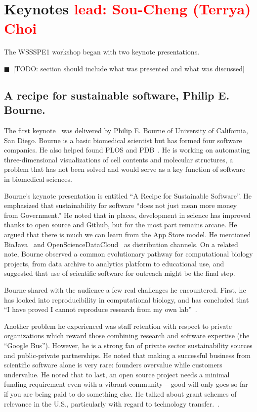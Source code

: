 \documentclass[11pt, oneside]{amsart}
\newcommand{\todo}[1]{{\color{blue}$\blacksquare$~\textsf{[TODO: #1]}}}
\newcommand{\note}[1]{ {\textcolor{red}    { #1 }}}
\begin{document}
\section{Keynotes\note{lead: Sou-Cheng (Terrya) Choi}} \label{sec:keynotes}

The WSSSPE1 workshop began with two keynote presentations.

\todo{section should include what was presented and what was discussed}

\subsection{A recipe for sustainable software, Philip E. Bourne.}

The first
keynote~\cite{WSSSPE1-keynote1}
was delivered by Philip E. Bourne of University of California, San Diego.  Bourne is a basic biomedical scientist but has formed four software
companies. He also helped found PLOS and
PDB~\cite{pdb-web}.  He is
working on automating three-dimensional visualizations of cell
contents and molecular structures, a problem that has not been solved
and would serve as a key function of software in biomedical sciences.

Bourne's keynote presentation is entitled ``A Recipe for Sustainable Software''.
He emphasized that sustainability for software ``does not just
mean more money from Government.''  He noted that in places,
development in science has improved thanks to open source and Github,
but for the most part remains arcane. He argued that there is much we
can learn from the App Store model. He mentioned
BioJava~\cite{biojava-web} and
OpenScienceDataCloud~\cite{osdc-web}
as distribution channels.  On a related note, Bourne observed a common
evolutionary pathway for computational biology projects, from data
archive to analytics platform to educational use, and suggested that
use of scientific software for outreach might be the final step.

Bourne shared with the audience a few real challenges he
encountered. First, he has looked into reproducibility in
computational biology, and has concluded that ``I have proved I cannot
reproduce research from my own lab''~\cite{Veretnik}.

Another problem he experienced was staff retention with respect to
private organizations which reward those combining research and
software expertise (the ``Google Bus''). However, he is a strong fan
of private sector sustainability sources and public-private
partnerships. He noted that making a successful business from
scientific software alone is very rare: founders overvalue while
customers undervalue. He noted that to last, an open source project
needs a minimal funding requirement even with a vibrant community --
good will only goes so far if you are being paid to do something else.
He talked about grant schemes of relevance in the U.S., particularly
with regard to technology transfer.~\cite{sbir-web, fased-web}.
\end{document}
